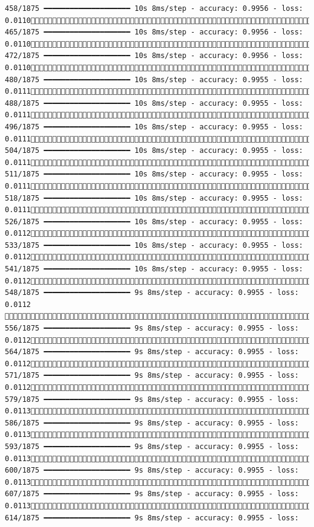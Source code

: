 \documentclass[
  letterpaper,
  DIV=11,
  numbers=noendperiod]{scrreprt}
\begin{document}
\begin{verbatim}
458/1875 ━━━━━━━━━━━━━━━━━━━━ 10s 8ms/step - accuracy: 0.9956 - loss: 0.0110 465/1875 ━━━━━━━━━━━━━━━━━━━━ 10s 8ms/step - accuracy: 0.9956 - loss: 0.0110 472/1875 ━━━━━━━━━━━━━━━━━━━━ 10s 8ms/step - accuracy: 0.9956 - loss: 0.0110 480/1875 ━━━━━━━━━━━━━━━━━━━━ 10s 8ms/step - accuracy: 0.9955 - loss: 0.0111 488/1875 ━━━━━━━━━━━━━━━━━━━━ 10s 8ms/step - accuracy: 0.9955 - loss: 0.0111 496/1875 ━━━━━━━━━━━━━━━━━━━━ 10s 8ms/step - accuracy: 0.9955 - loss: 0.0111 504/1875 ━━━━━━━━━━━━━━━━━━━━ 10s 8ms/step - accuracy: 0.9955 - loss: 0.0111 511/1875 ━━━━━━━━━━━━━━━━━━━━ 10s 8ms/step - accuracy: 0.9955 - loss: 0.0111 518/1875 ━━━━━━━━━━━━━━━━━━━━ 10s 8ms/step - accuracy: 0.9955 - loss: 0.0111 526/1875 ━━━━━━━━━━━━━━━━━━━━ 10s 8ms/step - accuracy: 0.9955 - loss: 0.0112 533/1875 ━━━━━━━━━━━━━━━━━━━━ 10s 8ms/step - accuracy: 0.9955 - loss: 0.0112 541/1875 ━━━━━━━━━━━━━━━━━━━━ 10s 8ms/step - accuracy: 0.9955 - loss: 0.0112 548/1875 ━━━━━━━━━━━━━━━━━━━━ 9s 8ms/step - accuracy: 0.9955 - loss: 0.0112  556/1875 ━━━━━━━━━━━━━━━━━━━━ 9s 8ms/step - accuracy: 0.9955 - loss: 0.0112 564/1875 ━━━━━━━━━━━━━━━━━━━━ 9s 8ms/step - accuracy: 0.9955 - loss: 0.0112 571/1875 ━━━━━━━━━━━━━━━━━━━━ 9s 8ms/step - accuracy: 0.9955 - loss: 0.0112 579/1875 ━━━━━━━━━━━━━━━━━━━━ 9s 8ms/step - accuracy: 0.9955 - loss: 0.0113 586/1875 ━━━━━━━━━━━━━━━━━━━━ 9s 8ms/step - accuracy: 0.9955 - loss: 0.0113 593/1875 ━━━━━━━━━━━━━━━━━━━━ 9s 8ms/step - accuracy: 0.9955 - loss: 0.0113 600/1875 ━━━━━━━━━━━━━━━━━━━━ 9s 8ms/step - accuracy: 0.9955 - loss: 0.0113 607/1875 ━━━━━━━━━━━━━━━━━━━━ 9s 8ms/step - accuracy: 0.9955 - loss: 0.0113 614/1875 ━━━━━━━━━━━━━━━━━━━━ 9s 8ms/step - accuracy: 0.9955 - loss: 
\end{verbatim}
\end{document}
